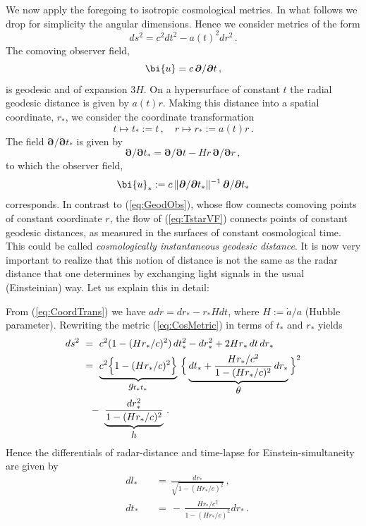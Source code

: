 \documentclass
[rmp,aps,twocolumn,showpacs,preprintnumbers,amsmath,amssymb]{revtex4}
\theoremstyle{plain}
\theoremstyle{definition}
\theoremstyle{remark}
\newcommand{\norm}[1]{\lVert#1\rVert}         %
\newcommand{\bpartial}{\boldsymbol{\partial}} %
\newcommand{\bu}{\bi{u}}
\begin{document}
We now apply the foregoing to isotropic cosmological metrics. 
In what follows we drop for simplicity the angular dimensions. 
Hence we consider metrics of the form
%
\begin{equation}\label{eq:CosMetric}
  ds^2 = c^2dt^2 - a(t)^2dr^2\,.
\end{equation}
%
The comoving observer field,  
%
\begin{equation}\label{eq:GeodObs}
  \bu = c\,\bpartial/\bpartial t \,,
\end{equation} 
%
is geodesic and of expansion $3H$. On a hypersurface of constant $t$ 
the radial geodesic distance is given by $a(t)r$. Making this distance 
into a spatial coordinate, $r_*$, we consider the coordinate transformation 
%
\begin{equation}\label{eq:CoordTrans}
  t\mapsto t_*:=t\,,\quad
  r\mapsto r_*:=a(t)r\,.
\end{equation}
%
The field $\bpartial/\bpartial t_*$ is given by 
%
\begin{equation}\label{eq:TstarVF}
  \bpartial/\bpartial t_* =
  \bpartial/\bpartial t - Hr\,\bpartial/\bpartial r\,,
\end{equation}
%
to which the observer field, 
%
\begin{equation}\label{eq:ObsFieldStar}
  \bu_* := c\,\norm{\bpartial/\bpartial t_*}^{-1}\,\bpartial/\bpartial t_*
\end{equation}
%
corresponds. In contrast to (\ref{eq:GeodObs}), whose flow connects 
comoving points of constant coordinate $r$, the flow of 
(\ref{eq:TstarVF}) connects points of constant geodesic distances, 
as measured in the surfaces of constant cosmological time. This could 
be called \emph{cosmologically instantaneous geodesic distance}. 
It is now very important to realize that this notion of distance is not the 
same as the radar distance that one determines by exchanging light signals 
in the usual (Einsteinian) way. Let us explain this in detail: 

From (\ref{eq:CoordTrans}) we have $adr=dr_*-r_*Hdt$, where 
$H:=\dot a/a$ (Hubble parameter). Rewriting the metric 
(\ref{eq:CosMetric}) in terms of $t_*$ and $r_*$ yields
%
\begin{alignat}{1}
  ds^2
  &\ =\ c^2(1-(Hr_*/c)^2)\,dt_*^2-dr_*^2+2Hr_*\,dt\,dr_*\nonumber\\
  &\ =\ \underbrace{c^2\Bigl\{1-(Hr_*/c)^2\Bigr\}}_{\textstyle g_{t_*t_*}}\
        \Bigl\{\,\underbrace{dt_*+\frac{Hr_*/c^2}{1-(Hr_*/c)^2}\,dr_*}_{%
        \textstyle\theta}\,\Bigr\}^2\nonumber\\
\label{eq:MetricNewCoord}
  &\quad-\ \underbrace{\frac{dr_*^2}{1-(Hr_*/c)^2}}_{\textstyle h}\,.
\end{alignat}
%
Hence the differentials of radar-distance and  time-lapse for 
Einstein-simultaneity are given by  
%
\begin{subequations}\label{eq:DiffStarQuant}
\begin{alignat}{2}
\label{eq:DiffRadDist}
  & dl_*&&\,=\,\frac{dr_*}{\sqrt{1-(Hr_*/c)^2}}\,,\\
\label{eq:DiffLapseEinstSim}
  & dt_*&&\,=\,-\,\frac{Hr_*/c^2}{1-(Hr_*/c)^2}dr_*\,.
\end{alignat}
\end{subequations}
%
\end{document}
